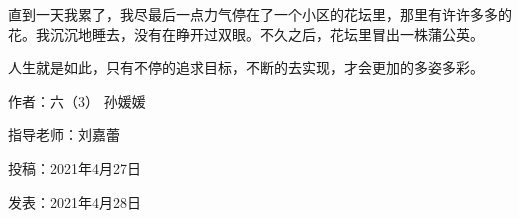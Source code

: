 直到一天我累了，我尽最后一点力气停在了一个小区的花坛里，那里有许许多多的花。我沉沉地睡去，没有在睁开过双眼。不久之后，花坛里冒出一株蒲公英。



人生就是如此，只有不停的追求目标，不断的去实现，才会更加的多姿多彩。





\vspace{10pt}



作者：六（3） 孙媛媛



指导老师：刘嘉蕾



投稿：2021年4月27日



发表：2021年4月28日








                



\vspace{10pt}

\hline



